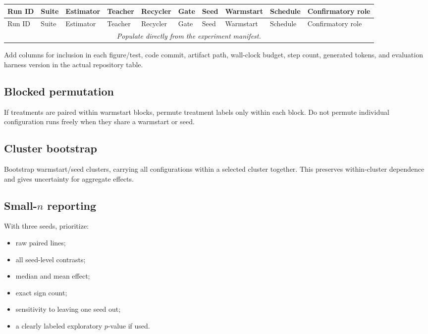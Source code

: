 \documentclass[11pt]{article}
\theoremstyle{definition}
\theoremstyle{remark}
\begin{document}
\small
\begin{longtable}{p{}p{}p{}p{}p{}p{}p{}p{}p{}p{}}
\toprule
Run ID & Suite & Estimator & Teacher & Recycler & Gate & Seed & Warmstart & Schedule & Confirmatory role\\
\midrule
\endfirsthead
\toprule
Run ID & Suite & Estimator & Teacher & Recycler & Gate & Seed & Warmstart & Schedule & Confirmatory role\\
\midrule
\endhead
\multicolumn{10}{c}{\emph{Populate directly from the experiment manifest.}}\\
\bottomrule
\end{longtable}
\normalsize

Add columns for inclusion in each figure/test, code commit, artifact path, wall-clock budget, step count, generated tokens, and evaluation harness version in the actual repository table.

\subsection{Blocked permutation}

If treatments are paired within warmstart blocks, permute treatment labels only within each block. Do not permute individual configuration runs freely when they share a warmstart or seed.

\subsection{Cluster bootstrap}

Bootstrap warmstart/seed clusters, carrying all configurations within a selected cluster together. This preserves within-cluster dependence and gives uncertainty for aggregate effects.

\subsection{Small-$n$ reporting}

With three seeds, prioritize:

\begin{itemize}[leftmargin=2em]
\item raw paired lines;
\item all seed-level contrasts;
\item median and mean effect;
\item exact sign count;
\item sensitivity to leaving one seed out;
\item a clearly labeled exploratory $p$-value if used.
\end{itemize}
\end{document}

